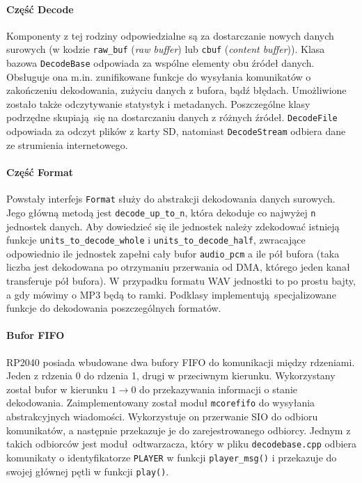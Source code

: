 \documentclass[polish]{aghengthesis}
\begin{document}
			\paragraph{Część Decode}
				Komponenty z tej rodziny odpowiedzialne są za dostarczanie nowych danych surowych (w kodzie \lstinline|raw_buf| (\textit{raw buffer}) lub \lstinline|cbuf| (\textit{content buffer})). Klasa bazowa \lstinline|DecodeBase| odpowiada za wspólne elementy obu źródeł danych. Obsługuje ona m.in. zunifikowane funkcje do wysyłania komunikatów o zakończeniu dekodowania, zużyciu danych z bufora, bądź błędach. Umożliwione zostało także odczytywanie statystyk i metadanych. Poszczególne klasy podrzędne skupiają się na dostarczaniu danych z różnych źródeł. \lstinline|DecodeFile| odpowiada za odczyt plików z karty SD, natomiast \lstinline|DecodeStream| odbiera dane ze strumienia internetowego.
			
			\paragraph{Część Format}
				Powstały interfejs \lstinline|Format| służy do abstrakcji dekodowania danych surowych. Jego główną metodą jest \lstinline|decode_up_to_n|, która dekoduje co najwyżej \lstinline|n| jednostek danych. Aby dowiedzieć się ile jednostek należy zdekodować istnieją funkcje \lstinline|units_to_decode_whole| i \lstinline|units_to_decode_half|, zwracające odpowiednio ile jednostek zapełni cały bufor \lstinline|audio_pcm| a ile pół bufora (taka liczba jest dekodowana po otrzymaniu przerwania od DMA, którego jeden kanał transferuje pół bufora). W przypadku formatu WAV jednostki to po prostu bajty, a gdy mówimy o MP3 będą to ramki. Podklasy implementują specjalizowane funkcje do dekodowania poszczególnych formatów.
			
			\paragraph{Bufor FIFO}
				RP2040 posiada wbudowane dwa bufory FIFO do komunikacji między rdzeniami. Jeden z rdzenia 0 do rdzenia 1, drugi w przeciwnym kierunku. Wykorzystany został bufor w kierunku $1 \rightarrow 0$ do przekazywania informacji o stanie dekodowania. Zaimplementowany został moduł \lstinline|mcorefifo| do wysyłania abstrakcyjnych wiadomości. Wykorzystuje on przerwanie SIO do odbioru komunikatów, a następnie przekazuje je do zarejestrowanego odbiorcy. Jednym z takich odbiorców jest moduł odtwarzacza, który w pliku \lstinline|decodebase.cpp| odbiera komunikaty o identyfikatorze \lstinline|PLAYER| w funkcji \lstinline|player_msg()| i przekazuje do swojej głównej pętli w funkcji \lstinline|play()|.
		
\end{document}
